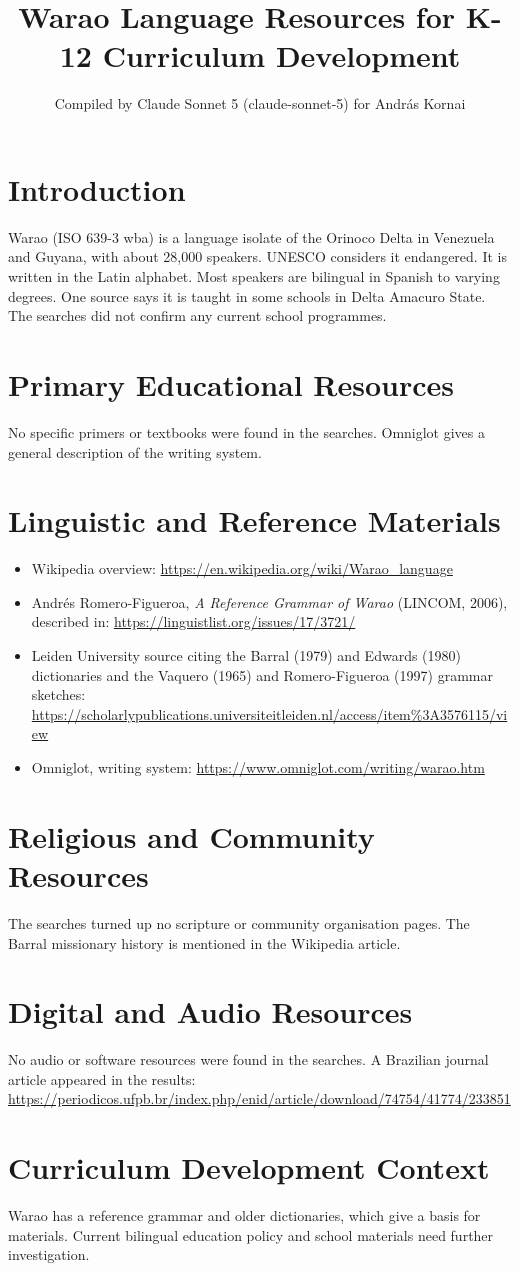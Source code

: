 \documentclass[12pt]{article}
\title{Warao Language Resources for K-12 Curriculum Development}
\author{Compiled by Claude Sonnet 5 (claude-sonnet-5) for Andr\'as Kornai}
\date{}
\begin{document}
\maketitle
\section{Introduction}
Warao (ISO 639-3 wba) is a language isolate of the Orinoco Delta in Venezuela and Guyana, with about 28,000 speakers. UNESCO considers it endangered. It is written in the Latin alphabet. Most speakers are bilingual in Spanish to varying degrees. One source says it is taught in some schools in Delta Amacuro State. The searches did not confirm any current school programmes.
\section{Primary Educational Resources}
No specific primers or textbooks were found in the searches. Omniglot gives a general description of the writing system.
\section{Linguistic and Reference Materials}
\begin{itemize}
\item Wikipedia overview: \url{https://en.wikipedia.org/wiki/Warao_language}
\item Andr\'es Romero-Figueroa, \emph{A Reference Grammar of Warao} (LINCOM, 2006), described in: \url{https://linguistlist.org/issues/17/3721/}
\item Leiden University source citing the Barral (1979) and Edwards (1980) dictionaries and the Vaquero (1965) and Romero-Figueroa (1997) grammar sketches: \url{https://scholarlypublications.universiteitleiden.nl/access/item%3A3576115/view}
\item Omniglot, writing system: \url{https://www.omniglot.com/writing/warao.htm}
\end{itemize}
\section{Religious and Community Resources}
The searches turned up no scripture or community organisation pages. The Barral missionary history is mentioned in the Wikipedia article.
\section{Digital and Audio Resources}
No audio or software resources were found in the searches. A Brazilian journal article appeared in the results: \url{https://periodicos.ufpb.br/index.php/enid/article/download/74754/41774/233851}
\section{Curriculum Development Context}
Warao has a reference grammar and older dictionaries, which give a basis for materials. Current bilingual education policy and school materials need further investigation.
\end{document}
